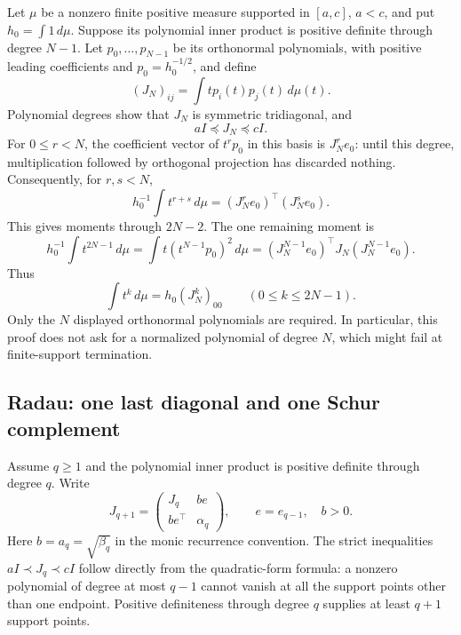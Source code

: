 \documentclass[11pt,a4paper]{article}
\theoremstyle{definition}
\begin{document}
Let $\mu$ be a nonzero finite positive measure supported in $[a,c]$,
$a<c$, and put $h_0=\int1\,d\mu$. Suppose its polynomial inner product
is positive definite through degree $N-1$. Let
$p_0,\ldots,p_{N-1}$ be its orthonormal polynomials, with positive
leading coefficients and $p_0=h_0^{-1/2}$, and define
\[
 (J_N)_{ij}=\int t p_i(t)p_j(t)\,d\mu(t).
\]
Polynomial degrees show that $J_N$ is symmetric tridiagonal, and
\[
 aI\preceq J_N\preceq cI.
 \tag{BL2}
\]
For $0\le r<N$, the coefficient vector of $t^rp_0$ in this basis is
$J_N^re_0$: until this degree, multiplication followed by orthogonal
projection has discarded nothing. Consequently, for $r,s<N$,
\[
 h_0^{-1}\int t^{r+s}\,d\mu
   =(J_N^re_0)^\top(J_N^se_0).
\]
This gives moments through $2N-2$. The one remaining moment is
\[
 h_0^{-1}\int t^{2N-1}\,d\mu
 =\int t(t^{N-1}p_0)^2\,d\mu
 =(J_N^{N-1}e_0)^\top J_N(J_N^{N-1}e_0).
\]
Thus
\[
 \int t^k\,d\mu=h_0(J_N^k)_{00}\qquad(0\le k\le2N-1).
 \tag{BL3}
\]
Only the $N$ displayed orthonormal polynomials are required. In
particular, this proof does not ask for a normalized polynomial of
degree $N$, which might fail at finite-support termination.

\subsection{Radau: one last diagonal and one Schur complement}

Assume $q\ge1$ and the polynomial inner product is positive definite
through degree $q$. Write
\[
 J_{q+1}=\begin{pmatrix}J_q&b e\\b e^\top&\alpha_q\end{pmatrix},
 \qquad e=e_{q-1},\quad b>0.
\]
Here $b=a_q=\sqrt{\beta_q}$ in the monic recurrence convention.
The strict inequalities $aI\prec J_q\prec cI$ follow directly from
the quadratic-form formula: a nonzero polynomial of degree at most
$q-1$ cannot vanish at all the support points other than one endpoint.
Positive definiteness through degree $q$ supplies at least $q+1$
support points.
\end{document}
